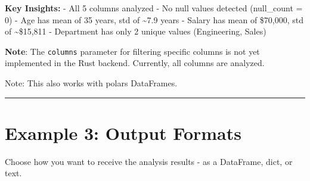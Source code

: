 \documentclass[
  letterpaper,
]{scrbook}
\begin{document}
\textbf{Key Insights:} - All 5 columns analyzed - No null values
detected (null\_count = 0) - Age has mean of 35 years, std of
\textasciitilde7.9 years - Salary has mean of \$70,000, std of
\textasciitilde\$15,811 - Department has only 2 unique values
(Engineering, Sales)

\textbf{Note}: The \texttt{columns} parameter for filtering specific
columns is not yet implemented in the Rust backend. Currently, all
columns are analyzed.

Note: This also works with polars DataFrames.

\begin{center}\rule{0.5\linewidth}{0.5pt}\end{center}

\section{Example 3: Output Formats}\label{example-3-output-formats}

Choose how you want to receive the analysis results - as a DataFrame,
dict, or text.
\end{document}
